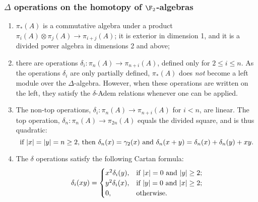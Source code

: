 \documentclass[11pt]{article}
\begin{document}
\begin{SteenrodAlgebrasAndTheirKoszulDuals}
\subsubsection{$\Delta$ operations on the homotopy of $\F_2$-algebras}
\begin{enumerate}\squishlist
\setlength{\parindent}{.25in}
\item $\pi_*(A)$ is a commutative algebra under a product $\pi_i(A)\otimes \pi_j(A)\to \pi_{i+j}(A)$; it is exterior in dimension 1, and it is a divided power algebra in dimensions 2 and above;
\item there are operations $\delta_i:\pi_n(A)\to \pi_{n+i}(A)$, defined only for $2\leq i\leq n$. 
As the operations $\delta_i$ are only partially defined, $\pi_*(A)$ does \emph{not} become a left module over the $\Delta$-algebra.
 However, when these operations are written on the left, they satisfy the $\delta$-Adem relations whenever one can be applied.
\item The non-top operations, $\delta_i:\pi_n(A)\to \pi_{n+i}(A)$ for $i<n$, are linear. The top operation, $\delta_n:\pi_n(A)\to \pi_{2n}(A)$ equals the divided square, and is thus quadratic:
\[\textup{if $|x|=|y|=n\geq2$, then }\delta_n(x)=\gamma_2(x)\textup{ and }\delta_n(x+y)=\delta_n(x)+\delta_n(y)+xy.\]
\item The $\delta$ operations satisfy the following Cartan formula:
\[\delta_i(xy)=\begin{cases}
x^2\delta_i(y),&\textup{if }|x|=0\textup{ and }|y|\geq2;\\
y^2\delta_i(x),&\textup{if }|y|=0\textup{ and }|x|\geq2;\\
0,&\textup{otherwise}.
\end{cases}
\]
\end{enumerate}

\end{SteenrodAlgebrasAndTheirKoszulDuals}
\end{document}
